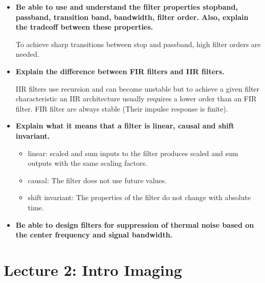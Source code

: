\documentclass[10pt,a4paper,noendnumber=true]{scrartcl}
\begin{document}
\begin{itemize}
\item \textbf{Be able to use and understand the filter properties stopband, passband, transition band, bandwidth, filter order. Also, explain the tradeoff between these properties.}

To achieve sharp transitions between stop and passband, high filter orders are needed. 

\item \textbf{Explain the difference between FIR filters and IIR filters.}

IIR filters use recursion and can become unstable but to achieve a given filter characteristic an IIR architecture usually requires a lower order than an FIR filter. FIR filter are always stable (Their impulse response is finite).

\item \textbf{Explain what it means that a filter is linear, causal and shift invariant.}

\begin{itemize}
\item linear: scaled and sum inputs to the filter produces scaled and sum outputs with the same scaling factors.
\item causal: The filter does not use future values.
\item shift invariant: The properties of the filter do not change with absolute time.
\end{itemize}

\item \textbf{Be able to design filters for suppression of thermal noise based on the center frequency and signal bandwidth.}
\end{itemize}

\newpage
\section{Lecture 2: Intro Imaging}
\end{document}
